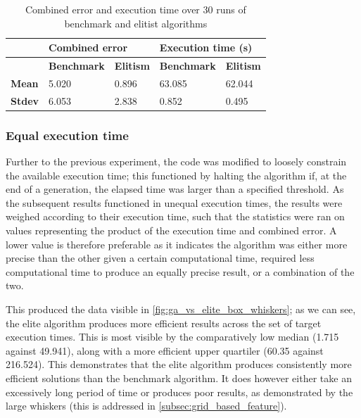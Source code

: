 \documentclass[authoryearcitations]{UoYCSproject}
\begin{document}
\begin{table}
\centering
\begin{tabular}{|l|l|l|l|l|}
\hline & \multicolumn{2}{l|}{\textbf{Combined error}} & \multicolumn{2}{l|}{\textbf{Execution time (s)}} \\ \hline & 
\textbf{Benchmark} & \textbf{Elitism}& \textbf{Benchmark}   & \textbf{Elitism}  \\ \hline 
\textbf{Mean} & 5.020   & 0.896  & 63.085 & 62.044  \\ \hline
\textbf{Stdev}  & 6.053   & 2.838& 0.852 & 0.495  \\ \hline
\end{tabular}
\caption[Effects of elitist against tournament selection (table)]{Combined error and execution time over 30 runs of benchmark and elitist algorithms}
\label{tab:ga_vs_elite_eq_pop_gen}
\end{table}

\subsubsection{Equal execution time}
\label{subsec:ga_vs_elite_time_sweep}
Further to the previous experiment, the code was modified to loosely constrain the available execution time; this functioned by halting the algorithm if, at the end of a generation, the elapsed time was larger than a specified threshold. As the subsequent results functioned in unequal execution times, the results were weighed according to their execution time, such that the statistics were ran on values representing the product of the execution time and combined error. A lower value is therefore preferable as it indicates the algorithm was either more precise than the other given a certain computational time, required less computational time to produce an equally precise result, or a combination of the two. 

This produced the data visible in \autoref{fig:ga_vs_elite_box_whiskers}; as we can see, the elite algorithm produces more efficient results across the set of target execution times. This is most visible by the comparatively low median (1.715 against 49.941), along with a more efficient upper quartiler (60.35 against 216.524). This demonstrates that the elite algorithm produces consistently more efficient solutions than the benchmark algorithm. It does however either take an excessively long period of time or produces poor results, as demonstrated by the large whiskers (this is addressed in \autoref{subsec:grid_based_feature}).
\end{document}
